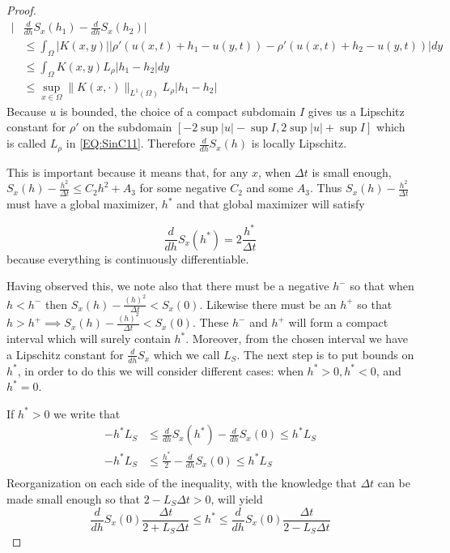 \documentclass[10pt,a4paper]{amsart}
\begin{document}
\begin{proof}
\begin{equation}
\begin{split}
            \bigg|&\frac{d}{dh}S_x(h_1)-\frac{d}{dh}S_x(h_2)\bigg|\\
            &\leq \int_\Omega |K(x,y)| |\rho'(u(x,t)+h_1-u(y,t))-\rho'(u(x,t)+h_2-u(y,t))|dy\\
            &\leq \int_\Omega K(x,y)L_{\rho}|h_1-h_2|dy\\
            &\leq \sup_{x\in\Omega}\|K(x,\cdot)\|_{L^1(\Omega)}L_{\rho}|h_1-h_2|
            \end{split} 
        \end{equation}
        Because $u$ is bounded, the choice of a compact subdomain $I$ gives us a Lipschitz constant for $\rho'$ on the subdomain $[-2\sup |u|-\sup I,2\sup|u|+\sup I]$ which is called $L_\rho$ in \eqref{EQ:SinC11}. Therefore $\frac{d}{dh}S_x(h)$ is locally Lipschitz. 

        This is important because it means that, for any $x$, when $\Delta t$ is small enough, $S_x(h)-\frac{h^2}{\Delta t}\leq C_2h^2+A_3$ for some negative $C_2$ and some $A_3$. Thus $S_x(h)-\frac{h^2}{\Delta t}$ must have a global maximizer, $h^*$ and that global maximizer will satisfy 
        
       \[\frac{d}{dh}S_x(h^*)=2\frac{h^*}{\Delta t}\]
        because everything is continuously differentiable. 

        Having observed this, we note also that there must be a negative $h^-$ so that when $h<h^-$ then $S_x(h)-\frac{(h)^2}{\Delta t}<S_x(0)$. Likewise there must be an $h^+$ so that $h>h^+\implies S_x(h)-\frac{(h)^2}{\Delta t}<S_x(0)$.
        These $h^-$ and $h^+$ will form a compact interval which will surely contain $h^*$. Moreover, from the chosen interval we have a Lipschitz constant for $\frac{d}{dh}S_x$ which we call $L_S$.
        The next step is to put bounds on $h^*$, in order to do this we will consider different cases: when $h^*>0, h^*<0$, and $h^*=0$. 

        If $h^*>0$ we write that 
        \begin{equation*}
            \begin{split}
                -h^*L_S&\leq \frac{d}{dh}S_x(h^*)-\frac{d}{dh}S_x(0)\leq h^*L_S\\
                -h^*L_S&\leq \frac{h^*}{2}-\frac{d}{dh}S_x(0)\leq h^*L_S\\
                \end{split}
        \end{equation*} 
        Reorganization on each side of the inequality, with the knowledge that $\Delta t$ can be made small enough so that $2-L_S\Delta t>0$, will yield 
        \begin{equation*}
                \frac{d}{dh}S_x(0)\frac{\Delta t}{2+L_S\Delta t}\leq h^*\leq \frac{d}{dh}S_x(0)\frac{\Delta t}{2-L_S\Delta t}
        \end{equation*}


\end{proof}
\end{document}
